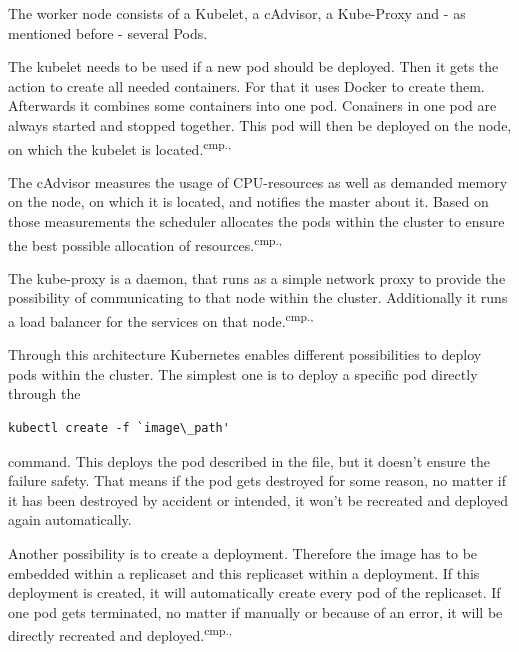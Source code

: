 The worker node consists of a Kubelet, a cAdvisor, a Kube-Proxy and - as mentioned before - several Pods. 

The kubelet needs to be used if a new pod should be deployed. Then it gets the action to create all needed containers. For that it uses Docker to create them. Afterwards it combines some containers into one pod. Conainers in one pod are always started and stopped together. This pod will then be deployed on the node, on which the kubelet is located.\textsuperscript{cmp.\cite{13}, \cite{16}}

The cAdvisor measures the usage of CPU-resources as well as demanded memory on the node, on which it is located, and notifies the master about it. Based on those measurements the scheduler allocates the pods within the cluster to ensure the best possible allocation of resources.\textsuperscript{cmp.\cite{13}, \cite{16}}

The kube-proxy is a daemon, that runs as a simple network proxy to provide the possibility of communicating to that node within the cluster. Additionally it runs a load balancer for the services on that node.\textsuperscript{cmp.\cite{13}, \cite{16}}

Through this architecture Kubernetes enables different possibilities to deploy pods within the cluster. The simplest one is to deploy a specific pod directly through the 
\begin{lstlisting}[caption={Create Kubernetes pod},captionpos=b]
kubectl create -f `image\_path'
\end{lstlisting}
command. This deploys the pod described in the file, but it doesn't ensure the failure safety. That means if the pod gets destroyed for some reason, no matter if it has been destroyed by accident or intended, it won't be recreated and deployed again automatically. 


Another possibility is to create a deployment. Therefore the image has to be embedded within a replicaset and this replicaset within a deployment. If this deployment is created, it will automatically create every pod of the replicaset. If one pod gets terminated, no matter if manually or because of an error, it will be directly recreated and deployed.\textsuperscript{cmp.\cite{13}, \cite{18}}

